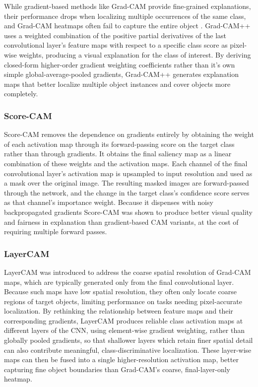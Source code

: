 While gradient-based methods like Grad-CAM provide fine-grained explanations, their performance drops when localizing multiple
occurrences of the same class, and Grad-CAM heatmaps often fail to capture the entire object \cite{chattopadhay2018grad}.
Grad-CAM++ uses a weighted combination of the positive partial derivatives of the last convolutional
layer's feature maps with respect to a specific class score as pixel-wise weights, producing a visual explanation for the class of
interest. By deriving closed-form higher-order gradient weighting coefficients rather than it's own simple global-average-pooled
gradients, Grad-CAM++ generates explanation maps that better localize multiple object instances and cover objects more completely.

\subsubsection{Score-CAM}

Score-CAM \cite{wang2020scorecam} removes the dependence on gradients entirely by obtaining
the weight of each activation map through its forward-passing score on the target class rather than through gradients.
It obtains the final saliency map as a linear combination of these weights and the activation maps. Each channel of the final
convolutional layer's activation map is upsampled to input resolution and used as a mask over the original image. The resulting
masked images are forward-passed through the network, and the change in the target class's confidence score serves as that
channel's importance weight. Because it dispenses with noisy backpropagated gradients Score-CAM was shown to produce
better visual quality and fairness in explanation than gradient-based CAM variants, at the cost of requiring multiple forward passes.

\subsubsection{LayerCAM}

LayerCAM \cite{jiang2021layercam} was introduced to address the coarse spatial resolution of Grad-CAM maps,
which are typically generated only from the final convolutional layer. Because such maps have low spatial resolution, they often
only locate coarse regions of target objects, limiting performance on tasks needing pixel-accurate localization. By rethinking the
relationship between feature maps and their corresponding gradients, LayerCAM produces reliable class activation maps at different
layers of the CNN, using element-wise gradient weighting, rather than globally pooled gradients, so that shallower layers which
retain finer spatial detail can also contribute meaningful, class-discriminative localization. These layer-wise maps can then be
fused into a single higher-resolution activation map, better capturing fine object boundaries than Grad-CAM's coarse,
final-layer-only heatmap.

